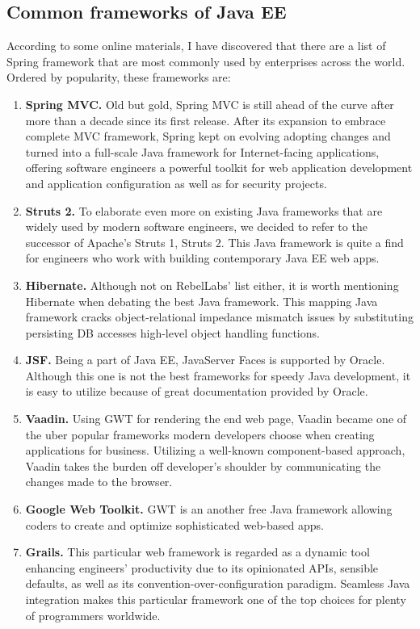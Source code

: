 \documentclass[a4paper]{report}
\begin{document}
\subsection{Common frameworks of Java EE}
According to some online materials, I have discovered that there are a list of Spring framework that are most commonly used by enterprises across the world. Ordered by popularity, these frameworks are:
\begin{enumerate}
  \item \textbf{Spring MVC.} Old but gold, Spring MVC is still ahead of the curve after more than a decade since its first release. After its expansion to embrace complete MVC framework, Spring kept on evolving adopting changes and turned into a full-scale Java framework for Internet-facing applications, offering software engineers a powerful toolkit for web application development and application configuration as well as for security projects.
  \item \textbf{Struts 2.} To elaborate even more on existing Java frameworks that are widely used by modern software engineers, we decided to refer to the successor of Apache’s Struts 1, Struts 2. This Java framework is quite a find for engineers who work with building contemporary Java EE web apps.
  \item \textbf{Hibernate.} Although not on RebelLabs’ list either, it is worth mentioning Hibernate when debating the best Java framework. This mapping Java framework cracks object-relational impedance mismatch issues by substituting persisting DB accesses high-level object handling functions.
  \item \textbf{JSF.} Being a part of Java EE, JavaServer Faces is supported by Oracle. Although this one is not the best frameworks for speedy Java development, it is easy to utilize because of great documentation provided by Oracle.
  \item \textbf{Vaadin.} Using GWT for rendering the end web page, Vaadin became one of the uber popular frameworks modern developers choose when creating applications for business. Utilizing a well-known component-based approach, Vaadin takes the burden off developer’s shoulder by communicating the changes made to the browser.
  \item \textbf{Google Web Toolkit.} GWT is an another free Java framework allowing coders to create and optimize sophisticated web-based apps.
  \item \textbf{Grails.} This particular web framework is regarded as a dynamic tool enhancing engineers’ productivity due to its opinionated APIs, sensible defaults, as well as its convention-over-configuration paradigm. Seamless Java integration makes this particular framework one of the top choices for plenty of programmers worldwide.
\end{enumerate}
\end{document}
